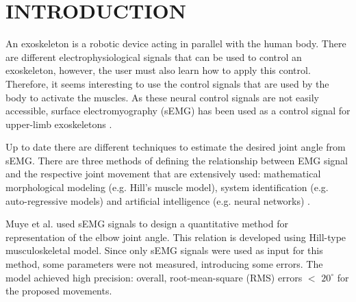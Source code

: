 \documentclass[letterpaper, 10 pt, conference]{ieeeconf}  %
\begin{document}
\section{INTRODUCTION}
An exoskeleton is a robotic device acting in parallel with the human body. There are different electrophysiological signals that can be used to control an exoskeleton, however, the user must also learn how to apply this control. Therefore, it seems interesting to use the control signals that are used by the body to activate the muscles. As these neural control signals are not easily accessible, surface electromyography (sEMG) has been used  as a control signal for upper-limb exoskeletons \cite{Lenzi2012} . 
% 
% 






Up to date there are different techniques to estimate the desired joint angle from sEMG. There are three methods of defining the relationship between EMG signal and the respective joint movement that are extensively used: mathematical morphological modeling (e.g. Hill's muscle model), system identification (e.g. auto-regressive models) and artificial intelligence (e.g. neural networks) \cite{Anam2012988}. 

Muye et al. \cite{Pang2015165} used sEMG signals to design a quantitative method for representation of the elbow joint angle. This relation is developed using Hill-type musculoskeletal model. Since only sEMG signals were used as input for this method, some parameters were not measured, introducing some errors. 
The model achieved high precision: overall, root-mean-square (RMS) errors \(<\) \(20^{\circ}\) for the proposed movements. 
% 
% 
\end{document}
